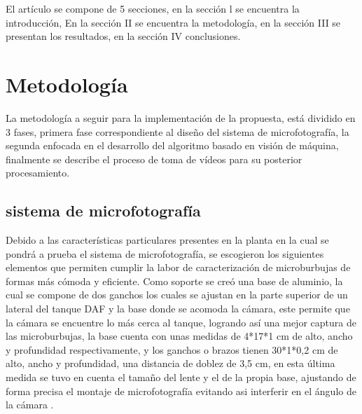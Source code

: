 \documentclass[12pt,twocolumn,a4paper]{article}
\begin{document}
El artículo se compone de 5 secciones, en la sección l se encuentra la introducción, En la sección II se encuentra la metodología, en la sección III  se presentan los resultados,  en la sección IV  conclusiones.

\section{Metodología}
La metodología a seguir para la implementación de la propuesta, está dividido en 3 fases, primera fase correspondiente al diseño del sistema de microfotografía,  la segunda enfocada en el desarrollo del algoritmo basado en visión de máquina, finalmente se describe el proceso de toma de vídeos para su posterior procesamiento.

\subsection{sistema de microfotografía }

Debido a las características particulares presentes en la planta en la cual se pondrá a prueba el sistema de microfotografía, se escogieron los siguientes elementos que permiten cumplir la labor de caracterización de microburbujas de formas más cómoda y eficiente. Como soporte se creó una base de aluminio, la cual  se compone de dos ganchos los cuales se ajustan en la parte superior de un lateral del tanque DAF y la base donde se acomoda la cámara, este permite que la cámara se encuentre lo más cerca al tanque, logrando así una mejor captura de las microburbujas, la base cuenta con unas medidas de 4*17*1 cm de alto, ancho y profundidad respectivamente, y los ganchos o brazos tienen   30*1*0,2 cm de alto, ancho y profundidad, una distancia de doblez  de 3,5 cm,  en esta última medida se tuvo en cuenta el tamaño del lente y el de la propia base, ajustando de forma precisa el montaje de microfotografía evitando asi interferir en el ángulo de la cámara \cite{tripode}. 
\end{document}
